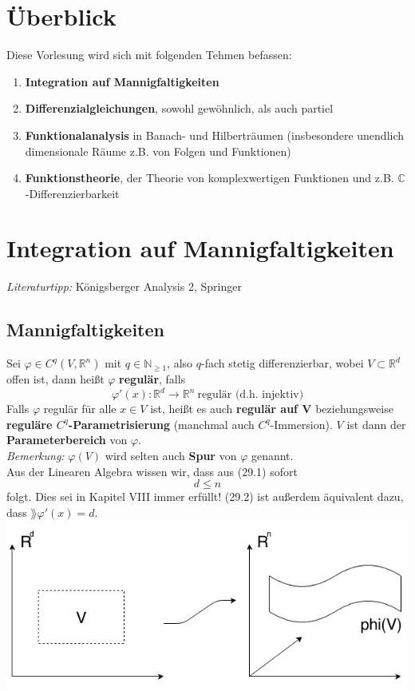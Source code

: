 \chapter*{Überblick}
Diese Vorlesung wird sich mit folgenden Tehmen befassen:
    \begin{enumerate}
    \item \textbf{Integration auf Mannigfaltigkeiten}
    \item \textbf{Differenzialgleichungen}, sowohl gewöhnlich, als auch partiel
    \item \textbf{Funktionalanalysis} in Banach- und Hilberträumen (insbesondere
    unendlich dimensionale Räume z.B. von Folgen und Funktionen)
    \item \textbf{Funktionstheorie}, der Theorie von komplexwertigen Funktionen
    und z.B. $\mathbb{C}$-Differenzierbarkeit
    \end{enumerate}

\chapter{Integration auf Mannigfaltigkeiten}
\emph{Literaturtipp:} Königsberger Analysis 2, Springer
\setcounter{section}{28}

\section{Mannigfaltigkeiten}
Sei $\varphi\in C^q(V,\mathbb{R}^n)$ mit $q\in\mathbb{N}_{\geq 1}$, also 
$q$-fach stetig differenzierbar, wobei $V\subset\mathbb{R}^d$ offen ist, 
dann heißt $\varphi$ \textbf{regulär}, falls
    \begin{equation}
    \varphi'(x):\mathbb{R}^d\rightarrow\mathbb{R}^n \ \text{regulär (d.h. injektiv)}
    \end{equation}
Falls $\varphi$ regulär für alle $x\in V$ ist, heißt es auch 
\textbf{regulär auf V} beziehungsweise \textbf{reguläre $C^q$-Parametrisierung} 
(manchmal auch $C^q$-Immersion). $V$ ist dann der \textbf{Parameterbereich} von $\varphi$.\\
\emph{Bemerkung:} $\varphi(V)$ wird selten auch \textbf{Spur} von $\varphi$ genannt.\\
\linebreak
\linebreak
Aus der Linearen Algebra wissen wir, dass aus (29.1) sofort 
    \begin{equation}
    d\leq n
    \end{equation}
folgt. Dies sei in Kapitel VIII immer erfüllt! (29.2) ist außerdem äquivalent dazu, dass $\rang \varphi'(x)=d$.\\
    \includegraphics[scale=0.5]{pictures/MA2_0001}

